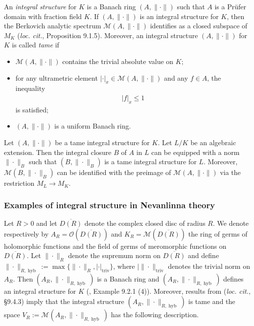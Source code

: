 \documentclass [11pt,reqno]{amsart}
\newcommand{\1}{\mathmybb{1}}
\def\cM{{\mathcal{M}}}
\def\cO{{\mathcal{O}}}
\def\hyb{\operatorname{hyb}}
\def\triv{\operatorname{triv}}
\begin{document}
An \emph{integral structure} for $K$ is a Banach ring $(A,\|\cdot\|)$ such that $A$ is a Prüfer domain with fraction field $K$. If $(A,\|\cdot\|)$ is an integral structure for $K$, then the Berkovich analytic spectrum $\cM(A,\|\cdot\|)$ identifies as a closed subspace of $M_K$ (\emph{loc. cit.}, Proposition 9.1.5). Moreover, an integral structure $(A,\|\cdot\|)$ for $K$ is called \emph{tame} if 
\begin{itemize}
	\item[(i)] $\cM(A,\|\cdot\|)$ contains the trivial absolute value on $K$;
	\item[(ii)] for any ultrametric element $|\cdot|_x\in \cM(A,\|\cdot\|)$ and any $f\in A$, the inequality
	\begin{align*}
	|f|_x \leq 1
	\end{align*}
	is satisfied;
	\item[(iii)] $(A, \|\cdot\|)$ is a uniform Banach ring.
\end{itemize}

\begin{proposition}
\label{prop:algebraic_extension_of_tame_spaces}
Let $(A,\|\cdot\|)$ be a tame integral structure for $K$. Let $L/K$ be an algebraic extension. Then the integral closure $B$ of $A$ in $L$ can be equipped with a norm $\|\cdot\|_B$ such that $(B,\|\cdot\|_{B})$ is a tame integral structure for $L$. Moreover, $\cM(B,\|\cdot\|_{B})$ can be identified with the preimage of $\cM(A,\|\cdot\|)$ via the restriction $M_L \to M_K$.
\end{proposition}

\subsubsection{Examples of integral structure in Nevanlinna theory}
\label{subsub:example_integral_structures}

Let $R>0$ and let $\overline{D(R)}$ denote the complex closed disc of radius $R$. We denote respectively by $A_R=\cO(\overline{D(R)})$ and $K_R=\cM(\overline{D(R)})$ the ring of germs of holomorphic functions and the field of germs of meromorphic functions on $\overline{D(R)}$. Let $\|\cdot\|_R$ denote the supremum norm on $\overline{D(R)}$  and define $\|\cdot\|_{R,\hyb}:=\max\{\|\cdot\|_R,|\cdot|_{\triv}\}$, where $|\|\cdot\|_{\triv}$ denotes the trivial norm on $A_R$. Then $(A_R,\|\cdot\|_{R,\hyb})$ is a Banach ring and $(A_R,\|\cdot\|_{R,\hyb})$ defines an integral structure for $K$ (\cite{Sedillot_pav}, Example 9.2.1 (4)). Moreover, results from (\emph{loc. cit.}, \S 9.4.3) imply that the integral structure $(A_R,\|\cdot\|_{R,\hyb})$ is tame and the space $V_{R}:=\cM(A_R,\|\cdot\|_{R,\hyb})$ has the following description. 
\end{document}
